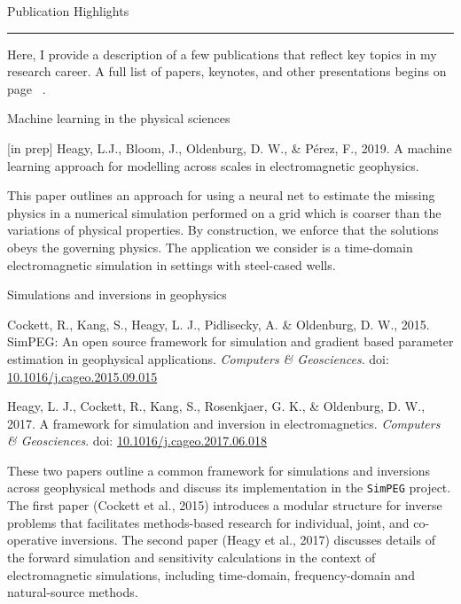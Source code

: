 \documentclass[a4paper, 11pt]{article}
\newcommand{\doi}[1]{doi: \href{https://doi.org/#1}{#1}}
\newcommand{\heading}[1]{
    \begin{minipage}[t]{\textwidth}
    \vspace{0.1cm}
    {\LARGE #1}\\
    \vspace{-0.24cm}
    \hrule
    \end{minipage}
    \vspace{0.05cm}

}
\newcommand{\subheading}[1]{
    \vspace{0.4cm}
    {\Large #1}\\
    \vspace{-0.2cm}
}
\begin{document}

\heading{Publication Highlights}

Here, I provide a description of a few publications that reflect key topics in my research career.
A full list of papers, keynotes, and other presentations begins on page ~\pageref{sec:publications}.

\subheading{Machine learning in the physical sciences}

\begin{myitemize}
    \item{[in prep] Heagy, L.J., Bloom, J., Oldenburg, D. W., \& P\'erez, F., 2019. A machine learning approach for modelling across scales in electromagnetic geophysics.}
\end{myitemize}

This paper outlines an approach for using a neural net to estimate the missing physics in a numerical simulation performed on a grid which is coarser than the variations of physical properties.
By construction, we enforce that the solutions obeys the governing physics.
The application we consider is a time-domain electromagnetic simulation in settings with steel-cased wells.

\subheading{Simulations and inversions in geophysics}

\begin{myitemize}
    \item Cockett, R., Kang, S., Heagy, L. J., Pidlisecky, A. \& Oldenburg, D. W., 2015. SimPEG: An open source framework for simulation and gradient based parameter estimation in geophysical applications. \emph{Computers \& Geosciences}. \doi{10.1016/j.cageo.2015.09.015}
    \item Heagy, L. J., Cockett, R., Kang, S., Rosenkjaer, G. K., \& Oldenburg, D. W., 2017. A framework for simulation and inversion in electromagnetics. \emph{Computers \& Geosciences}. \linebreak \doi{10.1016/j.cageo.2017.06.018}
\end{myitemize}

These two papers outline a common framework for simulations and inversions across geophysical methods and discuss its implementation in the \texttt{SimPEG} project. The first paper (Cockett et al., 2015) introduces a modular structure for inverse problems that facilitates methods-based research for individual, joint, and co-operative inversions.
The second paper (Heagy et al., 2017) discusses details of the forward simulation and sensitivity calculations in the context of electromagnetic simulations, including time-domain, frequency-domain and natural-source methods.
\end{document}

